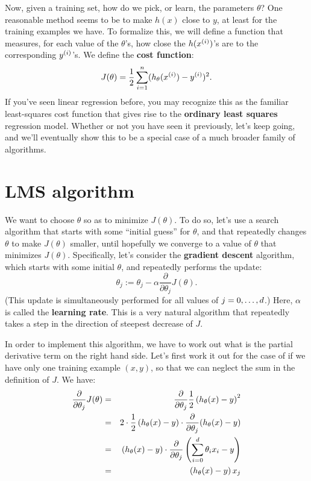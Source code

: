 \documentclass{article}
\begin{document}
Now, given a training set, how do we pick, or learn, the parameters $\theta$?
One reasonable method seems to be to make $h(x)$ close to $y$, at least
for the training examples we have.  To formalize this, we will define a
function that measures, for each value of the $\theta$'s, how close
the $h({x^{(i)}})$'s are to the corresponding ${y^{(i)}}$'s.  We define the {\bf cost function}:
\[
J(\theta) = \frac{1}{2} \sum_{i=1}^{{n}} (h_\theta({x^{(i)}}) - {y^{(i)}})^2.
\]
If you've seen linear regression before, you may recognize this as the
familiar least-squares cost function that gives rise to the
{\bf ordinary least squares} regression model.  Whether or not you have
seen it previously, let's keep going, and we'll eventually show this to
be a special case of a much broader family of algorithms.



\section{LMS algorithm}

We want to choose $\theta$ so as to minimize $J(\theta)$.  To do so, let's use a
search algorithm that starts with some ``initial guess'' for $\theta$, and that
repeatedly changes $\theta$ to make $J(\theta)$ smaller, until hopefully we converge
to a value of $\theta$ that minimizes $J(\theta)$.  Specifically, let's
consider the {\bf gradient descent} algorithm, which starts with some
initial $\theta$, and repeatedly performs the update:
\[
\theta_j := \theta_j - \alpha \frac{\partial}{\partial \theta_j} J(\theta).
\]
(This update is simultaneously performed for all values of $j=0,\ldots,{d}$.)
Here, $\alpha$ is called the {\bf learning rate}.  This is a very natural
algorithm that repeatedly takes a step in the direction of steepest
decrease of $J$.

In order to implement this algorithm, we have to work out what is the partial
derivative term on the right hand side.  Let's first work it out for the
case of if we have only one training example $(x,y)$, so that we can neglect
the sum in the definition of $J$.  We have:
\begin{eqnarray*}
\frac{\partial}{\partial \theta_j} J(\theta) &=&
\frac{\partial}{\partial \theta_j} \frac{1}{2} \left(h_\theta(x) - y\right)^2 \\
&=& 2 \cdot \frac{1}{2} \left(h_\theta(x) - y\right) \cdot
\frac{\partial}{\partial \theta_j} (h_\theta(x) - y) \\
&=& \left(h_\theta(x) - y\right) \cdot
\frac{\partial}{\partial \theta_j} \left( \sum_{i=0}^{d} \theta_i x_i - y \right)\\
&=& \left(h_\theta(x) - y\right) x_j
\end{eqnarray*}
\end{document}
